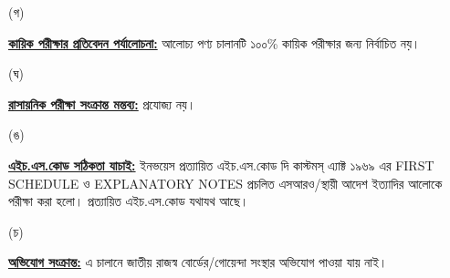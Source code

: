 \documentclass[12pt]{article}
\begin{document}
\begin{minipage}[t]{0.05\linewidth}
\hspace{1em}
\end{minipage}
\begin{minipage}[t]{0.05\linewidth}
(গ)
\end{minipage}
\begin{minipage}[t]{0.90\linewidth}
\underline{\textbf{কায়িক পরীক্ষার প্রতিবেদন পর্যালোচনা:}}
আলোচ্য পণ্য চালানটি ১০০\% কায়িক পরীক্ষার জন্য নির্বাচিত
নয়।
\\
\end{minipage}
\begin{minipage}[t]{0.05\linewidth}
\hspace{1em}
\end{minipage}
\begin{minipage}[t]{0.05\linewidth}
(ঘ)
\end{minipage}
\begin{minipage}[t]{0.90\linewidth}
\underline{\textbf{রাসায়নিক পরীক্ষা সংক্রান্ত মন্তব্য:}}
প্রযোজ্য নয়।
\\
\end{minipage}
\begin{minipage}[t]{0.05\linewidth}
\hspace{1em}
\end{minipage}
\begin{minipage}[t]{0.05\linewidth}
(ঙ)
\end{minipage}
\begin{minipage}[t]{0.90\linewidth}
\underline{\textbf{এইচ.এস.কোড সঠিকতা যাচাই:}}
ইনভয়েস প্রত্যায়িত এইচ.এস.কোড দি কাস্টমস্ এ্যাক্ট ১৯৬৯ এর FIRST SCHEDULE ও
EXPLANATORY NOTES প্রচলিত এসআরও/স্থায়ী আদেশ ইত্যাদির আলোকে পরীক্ষা করা হলো।
প্রত্যায়িত এইচ.এস.কোড যথাযথ আছে।
\\
\end{minipage}
\begin{minipage}[t]{0.05\linewidth}
\hspace{1em}
\end{minipage}
\begin{minipage}[t]{0.05\linewidth}
(চ)
\end{minipage}
\begin{minipage}[t]{0.90\linewidth}
\underline{\textbf{অভিযোগ সংক্রান্ত:}} এ চালানে জাতীয় রাজস্ব বোর্ডের/গোয়েন্দা
সংস্থার অভিযোগ পাওয়া যায় নাই।
\\
\end{minipage}
\begin{minipage}[t]{0.05\linewidth}
\hspace{1em}
\end{minipage}
\end{document}

